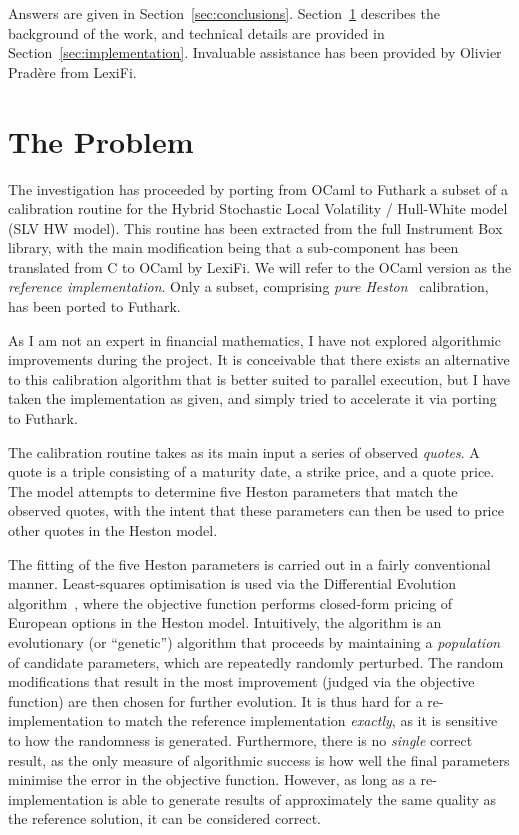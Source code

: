 \documentclass{article}
\begin{document}
Answers are given in Section~\ref{sec:conclusions}.
Section~\ref{sec:overview} describes the background of the work, and
technical details are provided in Section~\ref{sec:implementation}.
Invaluable assistance has been provided by Olivier Pradère from
LexiFi.

\section{The Problem}
\label{sec:overview}

The investigation has proceeded by porting from OCaml to Futhark a
subset of a calibration routine for the Hybrid Stochastic Local
Volatility / Hull-White model (SLV HW model).  This routine has been
extracted from the full Instrument Box library, with the main
modification being that a sub-component has been translated from C to
OCaml by LexiFi.  We will refer to the OCaml version as the
\textit{reference implementation}.  Only a subset, comprising
\textit{pure Heston}~\cite{mikhailovheston} calibration, has been
ported to Futhark.

As I am not an expert in financial mathematics, I have not explored
algorithmic improvements during the project.  It is conceivable that
there exists an alternative to this calibration algorithm that is
better suited to parallel execution, but I have taken the
implementation as given, and simply tried to accelerate it via porting
to Futhark.

The calibration routine takes as its main input a series of observed
\textit{quotes}.  A quote is a triple consisting of a maturity date, a
strike price, and a quote price.  The model attempts to determine five
Heston parameters that match the observed quotes, with the intent that
these parameters can then be used to price other quotes in the Heston
model.

The fitting of the five Heston parameters is carried out in a fairly
conventional manner.  Least-squares optimisation is used via the
Differential Evolution algorithm~\cite{Storn1997}, where the objective
function performs closed-form pricing of European options in the
Heston model.  Intuitively, the algorithm is an evolutionary (or
``genetic'') algorithm that proceeds by maintaining a
\textit{population} of candidate parameters, which are repeatedly
randomly perturbed.  The random modifications that result in the most
improvement (judged via the objective function) are then chosen for
further evolution.  It is thus hard for a re-implementation to match
the reference implementation \textit{exactly}, as it is sensitive to
how the randomness is generated.  Furthermore, there is no
\textit{single} correct result, as the only measure of algorithmic
success is how well the final parameters minimise the error in the
objective function.  However, as long as a re-implementation is able
to generate results of approximately the same quality as the reference
solution, it can be considered correct.
\end{document}
